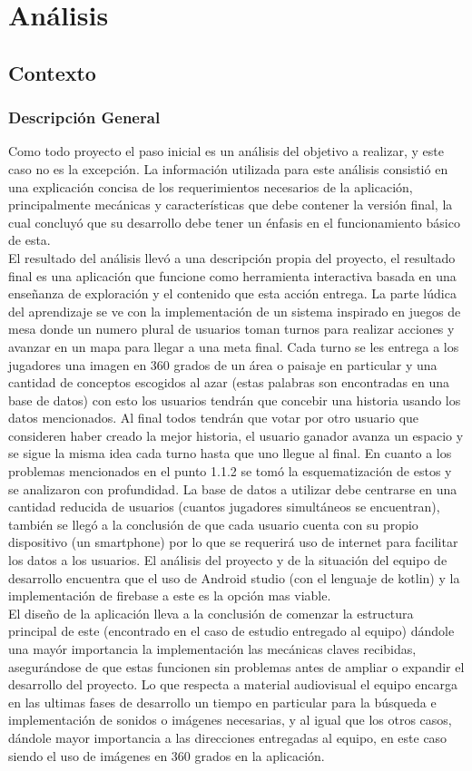 \section{Análisis}

\subsection{Contexto}
\subsubsection{Descripción General}
Como todo proyecto el paso inicial es un análisis del objetivo a realizar, y este caso no es la excepción. La información utilizada para este análisis consistió en una explicación concisa de los requerimientos necesarios de la aplicación, principalmente mecánicas y características que debe contener la versión final, la cual concluyó que su desarrollo debe tener un énfasis en el funcionamiento básico de esta.\\
El resultado del análisis llevó a una descripción propia del proyecto, el resultado final es una aplicación que funcione como herramienta interactiva basada en una enseñanza de exploración y el contenido que esta acción entrega. La parte lúdica del aprendizaje se ve con la implementación de un sistema inspirado en juegos de mesa donde un numero plural de usuarios toman turnos para realizar acciones y avanzar en un mapa para llegar a una meta final. Cada turno se les entrega a los jugadores una imagen en 360 grados de un área o paisaje en particular y una cantidad de conceptos escogidos al azar (estas palabras son encontradas en una base de datos) con esto los usuarios tendrán que concebir una historia usando los datos mencionados. Al final todos tendrán que votar por otro usuario que consideren haber creado la mejor historia, el usuario ganador avanza un espacio y se sigue la misma idea cada turno hasta que uno llegue al final.
En cuanto a los problemas mencionados en el punto 1.1.2 se tomó la esquematización de estos y se analizaron con profundidad. La base de datos a utilizar debe centrarse en una cantidad reducida de usuarios (cuantos jugadores simultáneos se encuentran), también se llegó a la conclusión de que cada usuario cuenta con su propio dispositivo (un smartphone) por lo que se requerirá uso de internet para facilitar los datos a los usuarios. El análisis del proyecto y de la situación del equipo de desarrollo encuentra que el uso de Android studio (con el lenguaje de kotlin) y la implementación de firebase a este es la opción mas viable.\\
El diseño de la aplicación lleva a la conclusión de comenzar la estructura principal de este (encontrado en el caso de estudio entregado al equipo) dándole una mayór importancia la implementación las mecánicas claves recibidas, asegurándose de que estas funcionen sin problemas antes de ampliar o expandir el desarrollo del proyecto.
Lo que respecta a material audiovisual el equipo encarga en las ultimas fases de desarrollo un tiempo en particular para la búsqueda e implementación de sonidos o imágenes necesarias, y al igual que los otros casos, dándole mayor importancia a las direcciones entregadas al equipo, en este caso siendo el uso de imágenes en 360 grados en la aplicación.

